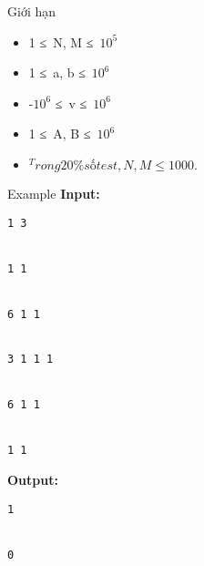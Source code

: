 Giới hạn
\begin{itemize}
	\item     1 ≤ N, M ≤ $10^{5}$
	\item     1 ≤ a, b ≤ $10^{6}$
	\item     -$10^{6}$    ≤ v ≤ $10^{6}$
	\item     1 ≤ A, B ≤ $10^{6}$
	\item $^     Trong 20\% số test, N, M ≤ 1000.    $
\end{itemize}
Example
\textbf{    Input:   }
\begin{verbatim}
1 3


1 1


6 1 1 


3 1 1 1 


6 1 1


1 1\end{verbatim}

\textbf{    Output:   }
\begin{verbatim}
1


0\end{verbatim}